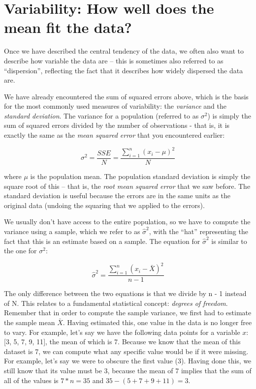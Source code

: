 \documentclass[
  12pt,
]{book}
\begin{document}
\hypertarget{variability-how-well-does-the-mean-fit-the-data}{%
\section{Variability: How well does the mean fit the data?}\label{variability-how-well-does-the-mean-fit-the-data}}

Once we have described the central tendency of the data, we often also want to describe how variable the data are -- this is sometimes also referred to as ``dispersion'', reflecting the fact that it describes how widely dispersed the data are.

We have already encountered the sum of squared errors above, which is the basis for the most commonly used measures of variability: the \emph{variance} and the \emph{standard deviation}. The variance for a population (referred to as \(\sigma^2\)) is simply the sum of squared errors divided by the number of observations - that is, it is exactly the same as the \emph{mean squared error} that you encountered earlier:

\[
\sigma^2 = \frac{SSE}{N} = \frac{\sum_{i=1}^n (x_i - \mu)^2}{N}
\]

where \(\mu\) is the population mean. The population standard deviation is simply the square root of this -- that is, the \emph{root mean squared error} that we saw before. The standard deviation is useful because the errors are in the same units as the original data (undoing the squaring that we applied to the errors).

We usually don't have access to the entire population, so we have to compute the variance using a sample, which we refer to as \(\hat{\sigma}^2\), with the ``hat'' representing the fact that this is an estimate based on a sample. The equation for \(\hat{\sigma}^2\) is similar to the one for \(\sigma^2\):

\[
\hat{\sigma}^2 = \frac{\sum_{i=1}^n (x_i - \bar{X})^2}{n-1}
\]

The only difference between the two equations is that we divide by n - 1 instead of N. This relates to a fundamental statistical concept: \emph{degrees of freedom}. Remember that in order to compute the sample variance, we first had to estimate the sample mean \(\bar{X}\). Having estimated this, one value in the data is no longer free to vary. For example, let's say we have the following data points for a variable \(x\): {[}3, 5, 7, 9, 11{]}, the mean of which is 7. Because we know that the mean of this dataset is 7, we can compute what any specific value would be if it were missing. For example, let's say we were to obscure the first value (3). Having done this, we still know that its value must be 3, because the mean of 7 implies that the sum of all of the values is \(7 * n = 35\) and \(35 - (5 + 7 + 9 + 11) = 3\).
\end{document}
